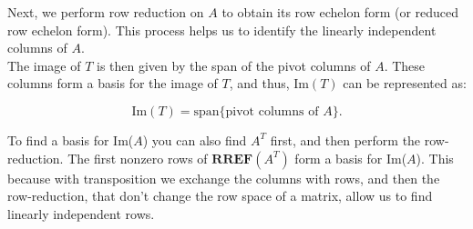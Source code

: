 Next, we perform row reduction on $A$ to obtain its row echelon form (or reduced row echelon form). This process helps us to identify the linearly independent columns of $A$.
\\

The image of $T$ is then given by the span of the pivot columns of $A$. These columns form a basis for the image of $T$, and thus, $\text{Im}(T)$ can be represented as:

\[
\text{Im}(T) = \text{span}\{\text{pivot columns of } A\}.
\]

To find a basis for Im($A$) you can also find $A^T$ first, and then perform the row-reduction. The first nonzero rows of $\textbf{RREF}(A^T)$ form a basis for Im($A$). This because with transposition we exchange the columns with rows, and then the row-reduction, that don’t change the row space of a matrix, allow us to find linearly independent rows.


